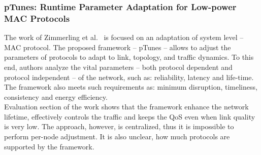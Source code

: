 \subsubsection*{pTunes: Runtime Parameter Adaptation for Low-power MAC Protocols}

The work of Zimmerling et al.~\cite{zimmerling12} is focused on an adaptation of system level -- MAC
protocol. The proposed framework -- pTunes -- allows to adjust the parameters
of protocols to adapt to link, topology, and traffic dynamics. To this end, authors
analyze the vital parameters -- both protocol dependent and protocol independent
-- of the network, such as: reliability, latency and life-time. The framework also
meets such requirements as: minimum disruption, timeliness, consistency and
energy efficiency.
\\
Evaluation section of the work shows that the framework enhance the network
lifetime, effectively controls the traffic and keeps the QoS even when link
quality is very low. The approach, however, is centralized, thus it is
impossible to perform per-node adjustment. It is also unclear, how much
protocols are supported by the framework.
